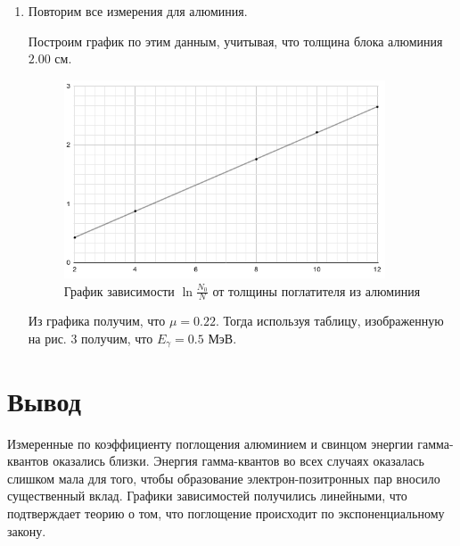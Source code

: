\documentclass[a4paper,12pt]{article}
\theoremstyle{plain} %
\theoremstyle{definition} %
\theoremstyle{remark} %
\begin{document}
\begin{enumerate}
\newpage
\item Повторим все измерения для алюминия.\par
\begin{table}[h]
\caption{Зависимость числа частиц, попадающих на счетчик, от толщины поглотителя из алюминия}
\end{table}
Построим график по этим данным, учитывая, что толщина блока алюминия $2.00$ см.\par
\begin{figure}[h]
    \centering
    \includegraphics[width=0.9\textwidth]{chart3.png}
    \caption{График зависимости $\ln{\frac{N_0}{N}}$ от толщины поглатителя из алюминия}
    \label{fig:my_label}
\end{figure}
Из графика получим, что $\mu = 0.22.$ Тогда используя таблицу, изображенную на рис. 3 получим, что $E_\gamma = 0.5$ МэВ.
\end{enumerate}

\section{Вывод}
Измеренные по коэффициенту поглощения алюминием и свинцом энергии гамма-квантов оказались близки. Энергия гамма-квантов во всех случаях оказалась слишком мала для того, чтобы образование электрон-позитронных пар вносило существенный вклад. Графики зависимостей получились линейными, что подтверждает теорию о том, что поглощение происходит по экспоненциальному закону.
\end{document}
